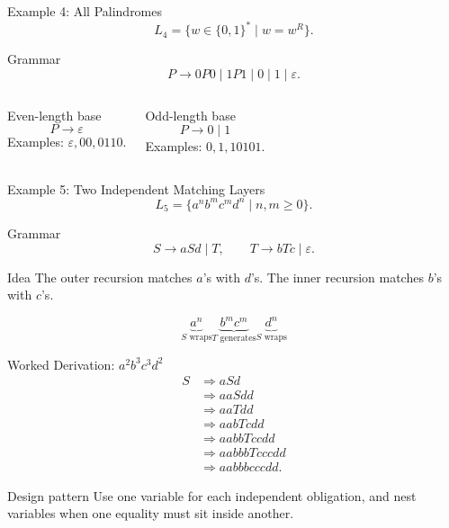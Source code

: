 \documentclass[aspectratio=169,10pt]{beamer}
\newcommand{\eps}{\varepsilon}
\newcommand{\der}{\Rightarrow}
\begin{document}
\begin{frame}{Example 4: All Palindromes}
\small
\[
L_4=\{w\in\{0,1\}^*\mid w=w^R\}.
\]

\begin{exampleblock}{Grammar}
\[
P\to 0P0\mid 1P1\mid 0\mid 1\mid\eps.
\]
\end{exampleblock}

\vspace{0.5em}
\begin{columns}[T,onlytextwidth]
\begin{block}{Even-length base}
\[
P\to\eps
\]
Examples: \(\eps,00,0110\).
\end{block}

\begin{exampleblock}{Odd-length base}
\[
P\to0\mid1
\]
Examples: \(0,1,10101\).
\end{exampleblock}
\end{columns}
\end{frame}

\begin{frame}{Example 5: Two Independent Matching Layers}
\small
\[
L_5=\{a^n b^m c^m d^n\mid n,m\ge0\}.
\]

\begin{exampleblock}{Grammar}
\[
S\to aSd\mid T,
\qquad
T\to bTc\mid\eps.
\]
\end{exampleblock}

\begin{block}{Idea}
The outer recursion matches \(a\)'s with \(d\)'s. The inner recursion matches \(b\)'s with \(c\)'s.
\end{block}

\[
\underbrace{a^n}_{S\text{ wraps}}
\underbrace{b^m c^m}_{T\text{ generates}}
\underbrace{d^n}_{S\text{ wraps}}
\]
\end{frame}

\begin{frame}{Worked Derivation: \(a^2b^3c^3d^2\)}
\small
\begin{align*}
S
&\der aSd\\
&\der aaSdd\\
&\der aaTdd\\
&\der aabTcdd\\
&\der aabbTccdd\\
&\der aabbbTcccdd\\
&\der aabbbcccdd.
\end{align*}

\begin{exampleblock}{Design pattern}
Use one variable for each independent obligation, and nest variables when one equality must sit inside another.
\end{exampleblock}
\end{frame}
\end{document}
